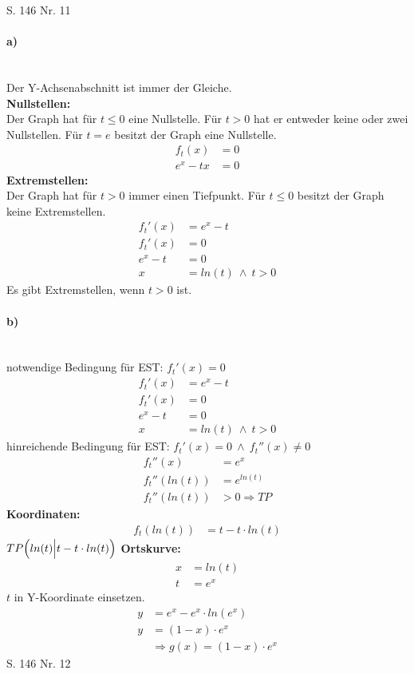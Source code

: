 \documentclass[a4paper, 12pt]{report}
\begin{document}
	\noindent
	\Large S. 146 Nr. 11
	\large
	\paragraph{a)} \mbox{} \\
	Der Y-Achsenabschnitt ist immer der Gleiche.
	\\
	\textbf{Nullstellen:} \\
	Der Graph hat für $t \leq 0$ eine Nullstelle. Für $t > 0$ hat er entweder keine oder zwei Nullstellen. Für $t = e$ besitzt der Graph eine Nullstelle.
	\\
	\begin{align*}
		f_t(x) &= 0 \\
		e^x - tx &= 0
	\end{align*}
	\textbf{Extremstellen:} \\
	Der Graph hat für $t > 0$ immer einen Tiefpunkt. Für $t \leq 0$ besitzt der Graph keine Extremstellen.
	\begin{align*}
		f_t'(x) &= e^x - t\\
		f_t'(x) &= 0 \\
		e^x - t &= 0 \\
		x &= ln(t)\ \land\ t > 0
	\end{align*}
	Es gibt Extremstellen, wenn $t > 0$ ist.
	\paragraph{b)} \mbox{} \\
	notwendige Bedingung für EST: $f_t'(x) = 0$
	\begin{align*}
		f_t'(x) &= e^x - t\\
		f_t'(x) &= 0 \\
		e^x - t &= 0 \\
		x &= ln(t)\ \land\ t > 0
	\end{align*}
	hinreichende Bedingung für EST: $f_t'(x) = 0\ \land\ f_t''(x) \ne 0$
	\begin{align*}
		f_t''(x) &= e^x \\
		f_t''(ln(t)) &= e^{ln(t)} \\
		f_t''(ln(t)) &> 0 \Rightarrow TP
	\end{align*}
	\textbf{Koordinaten:}
	\begin{align*}
		f_t(ln(t)) &= t - t \cdot ln(t)
	\end{align*}
	$TP \Bigl(ln(t)\Bigl|t - t \cdot ln(t) \Bigl)$
	\newpage
	\noindent
	\textbf{Ortskurve:}
	\begin{align*}
		x &= ln(t) \\
		t &= e^x
	\end{align*}
	$t$ in Y-Koordinate einsetzen.
	\begin{align*}
	y &= e^x - e^x \cdot ln(e^x) \\
	y &= (1-x) \cdot e^x	 \\
	& \Rightarrow g(x) = (1-x) \cdot e^x
	\end{align*}
	\Large S. 146 Nr. 12
	\\
\end{document}

